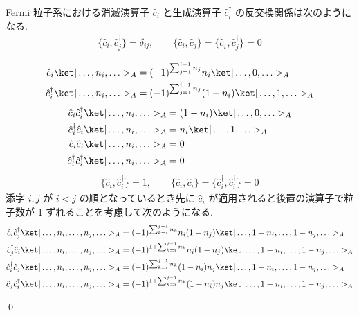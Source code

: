 \documentclass[uplatex,dvipdfmx,a4paper,11pt]{jlreq}
\makeatletter
\numberwithin{equation}{section}
\theoremstyle{definition}
\renewenvironment{proof}[1][\proofname]{\par
  \normalfont
  \topsep6\p@\@plus6\p@ \trivlist
  \item[\hskip\labelsep{\bfseries #1}\@addpunct{\bfseries}]\ignorespaces\quad\par
}{
  \qed\endtrivlist\@endpefalse
}
\renewcommand\proofname{証明}
\makeatother
\begin{document}
\begin{theorem}[Q21-52]
  Fermi 粒子系における消滅演算子 $\hat{c}_i$ と生成演算子 $\hat{c}_i^\dagger$ の反交換関係は次のようになる.
  \begin{align}
    \{\hat{c}_i, \hat{c}_j^\dagger\} = \delta_{ij}, \qquad \{\hat{c}_i, \hat{c}_j\} = \{\hat{c}_i^\dagger, \hat{c}_j^\dagger\} = 0
  \end{align}
\end{theorem}
\begin{proof}
  \begin{align}
    \hat{c}_i\ket|\ldots,n_i,\ldots>_A         & = (-1)^{\sum_{j=1}^{i-1}n_j}n_i\ket|\ldots,0,\ldots>_A       \\
    \hat{c}_i^\dagger\ket|\ldots,n_i,\ldots>_A & = (-1)^{\sum_{j=1}^{i-1}n_j}(1 - n_i)\ket|\ldots,1,\ldots>_A
  \end{align}
  \begin{align}
    \hat{c}_i\hat{c}_i^\dagger\ket|\ldots,n_i,\ldots>_A         & = (1 - n_i)\ket|\ldots,0,\ldots>_A \\
    \hat{c}_i^\dagger\hat{c}_i\ket|\ldots,n_i,\ldots>_A         & = n_i\ket|\ldots,1,\ldots>_A       \\
    \hat{c}_i\hat{c}_i\ket|\ldots,n_i,\ldots>_A                 & = 0                                \\
    \hat{c}_i^\dagger\hat{c}_i^\dagger\ket|\ldots,n_i,\ldots>_A & = 0
  \end{align}
  \begin{align}
    \{\hat{c}_i, \hat{c}_i^\dagger\} = 1, \qquad \{\hat{c}_i, \hat{c}_i\} = \{\hat{c}_i^\dagger, \hat{c}_i^\dagger\} = 0
  \end{align}
  添字 $i, j$ が $i < j$ の順となっているとき先に $\hat{c}_i$ が適用されると後置の演算子で粒子数が 1 ずれることを考慮して次のようになる.
  \begin{align}
    \hat{c}_i\hat{c}_j^\dagger\ket|\ldots,n_i,\ldots,n_j,\ldots>_A         & = (-1)^{\sum_{k=i}^{j-1}n_k}n_i(1 - n_j)\ket|\ldots,1-n_i,\ldots,1-n_j,\ldots>_A           \\
    \hat{c}_j^\dagger\hat{c}_i\ket|\ldots,n_i,\ldots,n_j,\ldots>_A         & = (-1)^{1 + \sum_{k=i}^{j-1}n_k}n_i(1 - n_j)\ket|\ldots,1-n_i,\ldots,1-n_j,\ldots>_A       \\
    \hat{c}_i^\dagger\hat{c}_j\ket|\ldots,n_i,\ldots,n_j,\ldots>_A         & = (-1)^{\sum_{k=i}^{j-1}n_k}(1 - n_i)n_j\ket|\ldots,1-n_i,\ldots,1-n_j,\ldots>_A           \\
    \hat{c}_j\hat{c}_i^\dagger\ket|\ldots,n_i,\ldots,n_j,\ldots>_A         & = (-1)^{1 + \sum_{k=i}^{j-1}n_k}(1 - n_i)n_j\ket|\ldots,1-n_i,\ldots,1-n_j,\ldots>_A       \\

\end{align}
\end{proof}
\end{document}
